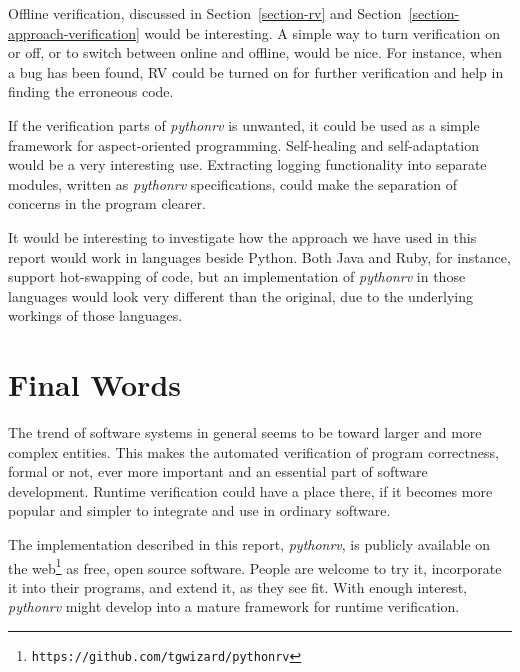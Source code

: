 \documentclass[a4paper,11pt]{kth-mag}
\theoremstyle{definition}
\begin{document}
Offline verification, discussed in Section~\ref{section-rv} and
Section~\ref{section-approach-verification} would be interesting. A simple way
to turn verification on or off, or to switch between online and offline, would
be nice. For instance, when a bug has been found, RV could be turned on for
further verification and help in finding the erroneous code.

If the verification parts of \textit{pythonrv} is unwanted, it could be used as
a simple framework for aspect-oriented programming. Self-healing and
self-adaptation would be a very interesting use. Extracting logging
functionality into separate modules, written as \textit{pythonrv}
specifications, could make the separation of concerns in the program clearer.

It would be interesting to investigate how the approach we have used in this
report would work in languages beside Python. Both Java and Ruby, for instance,
support hot-swapping of code, but an implementation of \textit{pythonrv} in
those languages would look very different than the original, due to the
underlying workings of those languages.


\section{Final Words}

The trend of software systems in general seems to be toward larger and more
complex entities. This makes the automated verification of program
correctness, formal or not, ever more important and an essential part of
software development. Runtime verification could have a place there, if it
becomes more popular and simpler to integrate and use in ordinary software.

The implementation described in this report, \textit{pythonrv}, is publicly
available on the web\footnote{\texttt{https://github.com/tgwizard/pythonrv}} as
free, open source software. People are welcome to try it, incorporate it into
their programs, and extend it, as they see fit. With enough interest,
\textit{pythonrv} might develop into a mature framework for runtime
verification.







\end{document}
